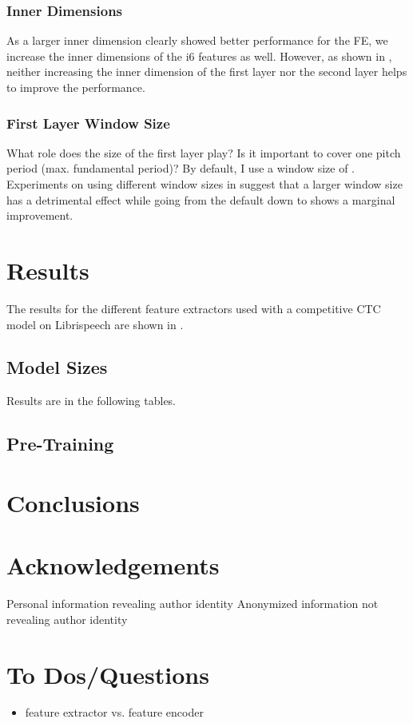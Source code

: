\documentclass{INTERSPEECH2023}
\begin{document}
\subsubsection{Inner Dimensions}
As a larger inner dimension clearly showed better performance for the \wvtwo \gls{FE}, we increase the inner dimensions of the i6 features as well.
However, as shown in , neither increasing the inner dimension of the first layer nor the second layer helps to improve the performance.

\subsubsection{First Layer Window Size}
What role does the size of the first layer play? Is it important to cover one pitch period (max. fundamental period)?
By default, I use a window size of .
Experiments on using different window sizes in  suggest that a larger window size has a detrimental effect while going from the default  down to  shows a marginal improvement.

\section{Results}
The results for the different feature extractors used with a competitive \gls{CTC} model on Librispeech are shown in .


\subsection{Model Sizes}
Results are in the following tables.





\subsection{\wvtwo Pre-Training}


\section{Conclusions}

\section{Acknowledgements}

\ifinterspeechfinal
     Personal information revealing author identity
\else
     Anonymized information not revealing author identity
\fi

{
\color{red}
\section{To Dos/Questions}
\begin{itemize}
  \item \wvtwo feature extractor vs. feature encoder
\end{itemize}
}



\end{document}
